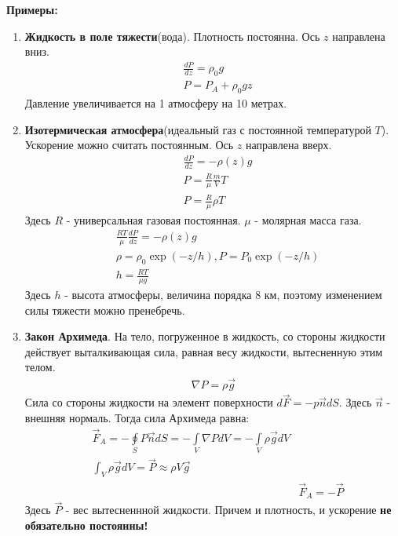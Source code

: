 \textbf{Примеры:}
\begin{enumerate}
	\item {\textbf{Жидкость в поле тяжести}(вода). Плотность постоянна. Ось $z$ направлена вниз.
	\begin{align*}
	& \frac { d P } { d z } = \rho _ { 0 } g \\
	& P = P _ { A } + \rho _ { 0 } g z
	\end{align*}
	Давление увеличивается на 1 атмосферу на 10 метрах.}
	\item {\textbf{Изотермическая атмосфера}(идеальный газ с постоянной температурой $T$). Ускорение можно считать постоянным. Ось $z$ направлена вверх.
	\begin{align*}
	& \frac { d P } { d z } = - \rho ( z ) g \\
	& P = \frac { R } { \mu } \frac { m } { V } T \\
	& P = \frac { R } { \mu } \rho T
	\end{align*}
	Здесь $R$ - универсальная газовая постоянная. $\mu$ - молярная масса газа.
	\begin{align*}
	& \frac { R T } { \mu } \frac { d P } { d z } = - \rho ( z ) g \\
	& \rho = \rho _ { 0 } \exp ( - z / h ) , P = P _ { 0 } \exp ( - z / h ) \\
	& h = \frac { R T } { \mu g }
	\end{align*}
	Здесь $h$ - высота атмосферы, величина порядка 8 км, поэтому изменением силы тяжести можно пренебречь.}
	\item {\textbf{Закон Архимеда}. На тело, погруженное в жидкость,  со стороны жидкости действует выталкивающая сила, равная весу жидкости, вытесненную этим телом.
	\begin{align*}
	\nabla P = \rho \vec { g }
	\end{align*}
	Сила со стороны жидкости на элемент поверхности $ d \vec { F } = - p \vec { n } d S $. Здесь $\vec{n}$ - внешняя нормаль. Тогда сила Архимеда равна:
	\begin{align*}
	& \vec { F }_ { A }  = - \oint \limits_ { S } P \vec{n} d S = - \int \limits_ { V } \nabla P d V = - \int \limits_ { V } \rho \vec { g } d V \\
	& \int _ { V } \rho \vec { g } d V = \vec { P } \approx \rho V \vec { g } \\
	& & \vec { F }_ { A } = - \vec { P }
	\end{align*}
	Здесь $\vec{P}$ - вес вытесненнной жидкости. Причем и плотность, и ускорение \textbf{не обязательно постоянны!}
	}
\end{enumerate}
